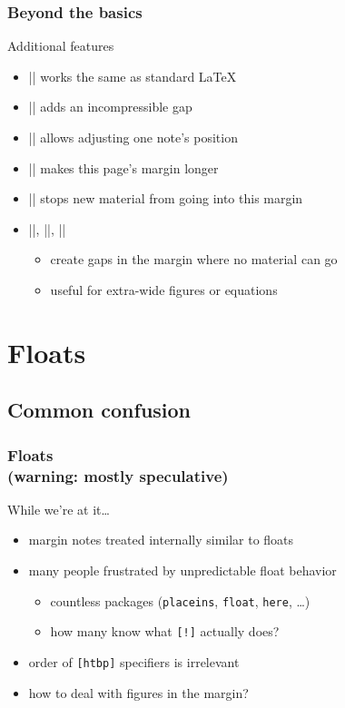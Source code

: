 \documentclass{beamer}
\begin{document}
\begin{frame}[fragile]
  \frametitle{Beyond the basics}
  \begin{block}{Additional features}
    \begin{itemize}
    \item |\marginparpush| works the same as standard \LaTeX
    \item || adds an incompressible gap
    \item || allows adjusting one note's position
    \item || makes this page's margin longer
    \item |\clearmargin| stops new material from going into this margin
    \item |\blockmargin|, |\unblockmargin|, ||
      \vskip-0.3pc
      \begin{itemize}
      \item create gaps in the margin where no material can go
      \item useful for extra-wide figures or equations
      \end{itemize}
    \end{itemize}
  \end{block}
\end{frame}

\section{Floats}
\subsection{Common confusion}
\begin{frame}
  \frametitle{Floats\\\normalsize(warning: mostly speculative)}
  \begin{block}{While we're at it\ldots}
    \begin{itemize}
    \item margin notes treated internally similar to floats
    \item many people frustrated by unpredictable float behavior
      \begin{itemize}
      \item countless packages (\texttt{placeins}, \texttt{float},
        \texttt{here}, \ldots)
      \item how many know what \texttt{[!]} actually does?
      \end{itemize}
    \item order of \texttt{[htbp]} specifiers is irrelevant
    \item how to deal with figures in the margin?
    \end{itemize}
  \end{block}
\end{frame}
\end{document}
